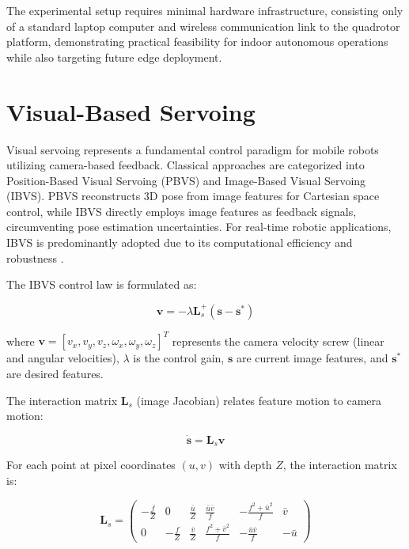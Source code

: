 \documentclass[10pt,twocolumn,letterpaper]{article}
\begin{document}
The experimental setup requires minimal hardware infrastructure, consisting only of a standard laptop computer and wireless communication link to the quadrotor platform, demonstrating practical feasibility for indoor autonomous operations while also targeting future edge deployment.

\section{Visual-Based Servoing}
\label{sec:related_work}
Visual servoing represents a fundamental control paradigm for mobile robots utilizing camera-based feedback. Classical approaches are categorized into Position-Based Visual Servoing (PBVS) and Image-Based Visual Servoing (IBVS). PBVS reconstructs 3D pose from image features for Cartesian space control\cite{qin2023perception, sun2025towards}, while IBVS directly employs image features as feedback signals, circumventing pose estimation uncertainties\cite{corke1996visual, yang2020autonomous, lee2012adaptive}. For real-time robotic applications, IBVS is predominantly adopted due to its computational efficiency and robustness \cite{yang2024high, kumar2024tracking}.

The IBVS control law is formulated as:

\begin{equation}
\mathbf{v} = -\lambda \mathbf{L}_s^+ (\mathbf{s} - \mathbf{s}^*)
\end{equation}

where $\mathbf{v} = [v_x, v_y, v_z, \omega_x, \omega_y, \omega_z]^T$ represents the camera velocity screw (linear and angular velocities), $\lambda$ is the control gain, $\mathbf{s}$ are current image features, and $\mathbf{s}^*$ are desired features.

The interaction matrix $\mathbf{L}_s$ (image Jacobian) relates feature motion to camera motion:

\begin{equation}
\dot{\mathbf{s}} = \mathbf{L}_s \mathbf{v}
\end{equation}

For each point at pixel coordinates $(u, v)$ with depth $Z$, the interaction matrix is:

\begin{equation}
\label{eq:ibvs-full}
\mathbf{L}_s = \begin{pmatrix}
-\frac{f}{Z} & 0 & \frac{\bar{u}}{Z} & \frac{\bar{u} \bar{v}}{f} & -\frac{f^2 + \bar{u}^2}{f} & \bar{v} \\
0 & -\frac{f}{Z} & \frac{\bar{v}}{Z} & \frac{f^2 + \bar{v}^2}{f} & -\frac{\bar{u} \bar{v}}{f} & -\bar{u}
\end{pmatrix}
\end{equation}
\end{document}
